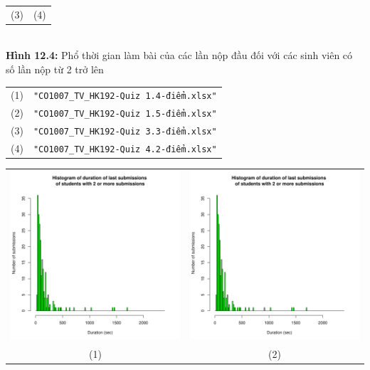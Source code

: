 \documentclass[a4paper]{article}
\theoremstyle{definition}
\begin{document}
\begin{enumerate}[a)]
\begin{itemize}
\begin{center}
\begin{tabular}{c c}
                 (3) & (4)
            \end{tabular}\\
            \textbf{Hình 12.4:} Phổ thời gian làm bài của các lần nộp đầu đối với các sinh viên có số lần nộp từ 2 trở lên\\
            \begin{tabular}{c c}
                 (1) & \texttt{"CO1007\_TV\_HK192-Quiz 1.4-điểm.xlsx"}\\
                 (2) & \texttt{"CO1007\_TV\_HK192-Quiz 1.5-điểm.xlsx"}\\
                 (3) & \texttt{"CO1007\_TV\_HK192-Quiz 3.3-điểm.xlsx"}\\
                 (4) & \texttt{"CO1007\_TV\_HK192-Quiz 4.2-điểm.xlsx"}
            \end{tabular}
        \end{center}
        \begin{center}
            \begin{tabular}{c c}
                 \includegraphics[width = 6.9cm]{Images/img12-5-2.png} & \includegraphics[width = 6.9cm]{Images/img12-5-2.png} \\
                 (1) & (2) \\

\end{tabular}
\end{center}
\end{itemize}
\end{enumerate}
\end{document}
